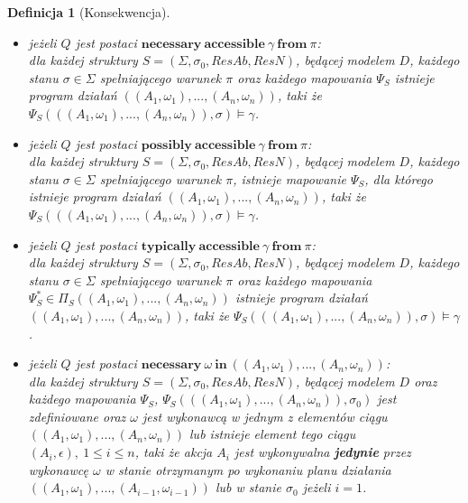 \documentclass[11pt,a4paper]{article}
\newtheorem{definition}{Definicja}[section]
\begin{document}
\begin{definition}[Konsekwencja]
\begin{itemize}
    	\item jeżeli $Q$ jest postaci $\mathbf{necessary}~\mathbf{accessible}~\gamma~\mathbf{from}~\pi$: \\
    	dla każdej struktury $S=(\Sigma, \sigma_0, ResAb, ResN)$, będącej modelem $D$, każdego stanu $\sigma \in \Sigma$ spełniającego warunek $\pi$ oraz każdego mapowania $\Psi_S$ istnieje program działań $((A_1, \omega_1), ..., (A_n, \omega_n))$, taki że $\Psi_S(((A_1, \omega_1), ..., (A_n, \omega_n)), \sigma) \models \gamma$.
    	
    	\item jeżeli $Q$ jest postaci $\mathbf{possibly}~\mathbf{accessible}~\gamma~\mathbf{from}~\pi$: \\
    	dla każdej struktury $S=(\Sigma, \sigma_0, ResAb, ResN)$, będącej modelem $D$, każdego stanu $\sigma \in \Sigma$ spełniającego warunek $\pi$, istnieje mapowanie $\Psi_S$, dla którego istnieje program działań $((A_1, \omega_1), ..., (A_n, \omega_n))$, taki że $\Psi_S(((A_1, \omega_1), ..., (A_n, \omega_n)), \sigma) \models \gamma$.
    	
    	\item jeżeli $Q$ jest postaci $\mathbf{typically}~\mathbf{accessible}~\gamma~\mathbf{from}~\pi$: \\
    	dla każdej struktury $S=(\Sigma, \sigma_0, ResAb, ResN)$, będącej modelem $D$, każdego stanu $\sigma \in \Sigma$ spełniającego warunek $\pi$ oraz każdego mapowania $\Psi_S^{*} \in \Pi_S((A_1, \omega_1),...,(A_n,\omega_n))$ istnieje program działań $((A_1, \omega_1), ..., (A_n, \omega_n))$, taki że $\Psi_S(((A_1, \omega_1), ..., (A_n, \omega_n)), \sigma) \models \gamma$.
    	
    	\item jeżeli $Q$ jest postaci $\mathbf{necessary}~\omega~\mathbf{in}~((A_1, \omega_1),...,(A_n,\omega_n))$: \\
    	 dla każdej struktury $S=(\Sigma, \sigma_0, ResAb, ResN)$, będącej modelem $D$ oraz każdego mapowania $\Psi_S$, $\Psi_S(((A_1, \omega_1), ..., (A_n, \omega_n)), \sigma_0)$ jest zdefiniowane oraz $\omega$ jest wykonawcą w jednym z elementów ciągu $((A_1, \omega_1),...,(A_n,\omega_n))$ lub istnieje element tego ciągu $(A_i, \epsilon),~1 \leq i \leq n$, taki że akcja $A_i$ jest wykonywalna \textbf{jedynie} przez wykonawcę $\omega$ w stanie otrzymanym po wykonaniu planu działania $((A_1, \omega_1),...,(A_{i-1},\omega_{i-1}))$ lub w stanie $\sigma_0$ jeżeli $i=1$.
    	 

\end{itemize}
\end{definition}
\end{document}
